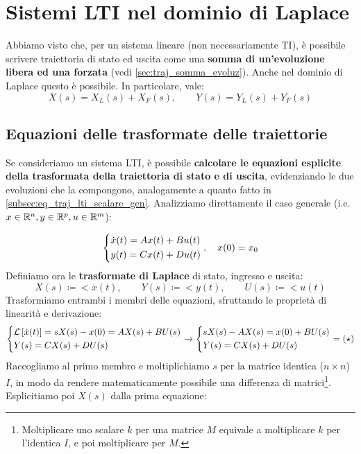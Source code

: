 \section{Sistemi LTI nel dominio di Laplace}
\begin{prop}
Abbiamo visto che, per un sistema lineare (non necessariamente TI), è possibile scrivere traiettoria di stato ed uscita come una \textbf{somma di un'evoluzione libera ed una forzata} (vedi \eqref{sec:traj_somma_evoluz}). Anche nel dominio di Laplace questo è possibile. In particolare, vale:
\begin{equation}
X(s) = X_L(s) + X_F(s), \quad \quad Y(s) = Y_L(s) + Y_F(s)
\end{equation}
\end{prop}
\subsection{Equazioni delle trasformate delle traiettorie}
Se consideriamo un sistema LTI, è possibile \textbf{calcolare le equazioni esplicite della trasformata della traiettoria di stato e di uscita}, evidenziando le due evoluzioni che la compongono, analogamente a quanto fatto in \eqref{subsec:eq_traj_lti_scalare_gen}. Analizziamo direttamente il caso generale (i.e.  $x \in \mathbb{R}^n, y \in \mathbb{R}^p, u \in \mathbb{R}^m$): 

\begin{equation*}
\begin{dcases}
\dot x(t) = Ax(t) + Bu(t) \\
y(t) = Cx(t) + Du(t)
\end{dcases}, \quad x(0) = x_0
\end{equation*}
Definiamo ora le \textbf{trasformate di Laplace} di stato, ingresso e uscita:
\begin{equation}
X(s) \coloneqq \lt{x(t)}, \quad \quad Y(s) \coloneqq \lt{y(t)}, \quad \quad U(s) \coloneqq \lt{u(t)}
\end{equation}
Trasformiamo entrambi i membri delle equazioni, sfruttando le proprietà di linearità e derivazione:
\begin{equation*}
\begin{dcases}
\mathcal{L}\left[ \dot x(t) \right] = sX(s) - x(0) = AX(s) + BU(s)\\
Y(s) = CX(s) + DU(s) 
\end{dcases} \rightarrow 
\begin{dcases}
sX(s) - AX(s) = x(0) + BU(s) \\
Y(s) = CX(s) + DU(s) 
\end{dcases} = (\star)
\end{equation*}
Raccogliamo al primo membro e moltiplichiamo $s$ per la matrice identica ($n \times n$) $I$, in modo da rendere matematicamente possibile una differenza di matrici\footnote{
Moltiplicare uno scalare $k$ per una matrice $M$ equivale a moltiplicare $k$ per l'identica $I$, e poi moltiplicare per $M$.}. Esplicitiamo poi $X(s)$ dalla prima equazione:

